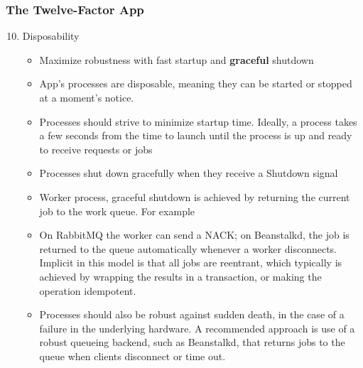 \documentclass{beamer}
\begin{document}
	\begin{frame}
		\frametitle{The Twelve-Factor App}
		\begin{enumerate}
			\setcounter{enumi}{9}
			\item Disposability \\
			\begin{itemize}
				\item<1->[] \scriptsize{Maximize robustness with fast startup and \textbf{graceful} shutdown}
				\item<2-> \scriptsize {App’s processes are disposable, meaning they can be started or stopped at a moment’s notice.}
				\item<3-> \scriptsize {Processes should strive to minimize startup time. Ideally, a process takes a few seconds from the time to launch until the process is up and ready to receive requests or jobs}
				\item<4-> \scriptsize {Processes shut down gracefully when they receive a Shutdown signal}
				\item<5-> \scriptsize {Worker process, graceful shutdown is achieved by returning the current job to the work queue. For example}
				\item<6->[] \scriptsize {On RabbitMQ the worker can send a NACK; on Beanstalkd, the job is returned to the queue automatically whenever a worker disconnects. Implicit in this model is that all jobs are reentrant, which typically is achieved by wrapping the results in a transaction, or making the operation idempotent.	
				}
				\vspace{1mm}
				\item<7-> \scriptsize{Processes should also be robust against sudden death, in the case of a failure in the underlying hardware. A recommended approach is use of a robust queueing backend, such as Beanstalkd, that returns jobs to the queue when clients disconnect or time out.}
			\end{itemize}
		\end{enumerate}
		\vspace{100mm}
	\end{frame}
\end{document}
